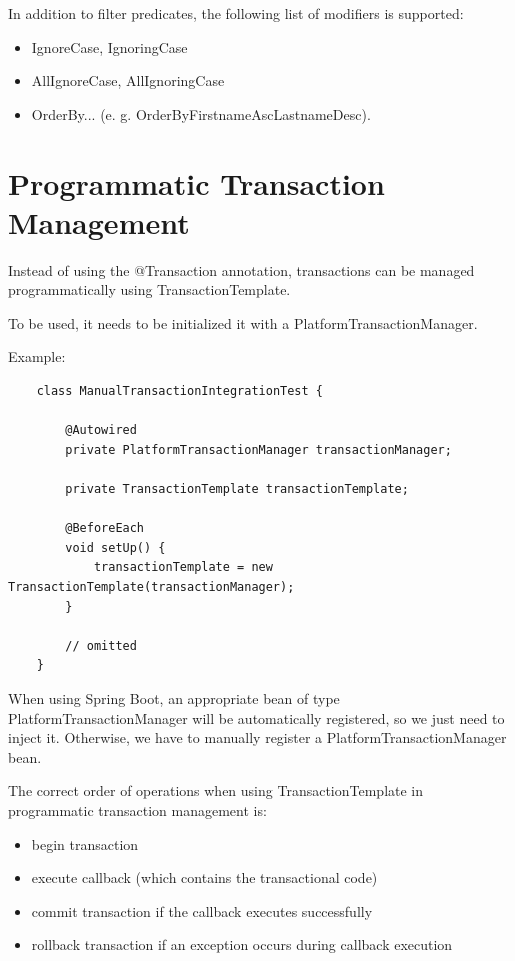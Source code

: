 \documentclass{scrartcl}
\begin{document}
    In addition to filter predicates, the following list of modifiers is supported:
    \begin{itemize}
        \item IgnoreCase, IgnoringCase
        \item AllIgnoreCase, AllIgnoringCase
        \item OrderBy... (e. g. OrderByFirstnameAscLastnameDesc).
    \end{itemize}

\section{Programmatic Transaction Management}

Instead of using the @Transaction annotation, transactions can be managed programmatically using TransactionTemplate.

To be used, it needs to be initialized it with a PlatformTransactionManager.

Example:

\begin{lstlisting}
    class ManualTransactionIntegrationTest {

        @Autowired
        private PlatformTransactionManager transactionManager;

        private TransactionTemplate transactionTemplate;

        @BeforeEach
        void setUp() {
            transactionTemplate = new TransactionTemplate(transactionManager);
        }

        // omitted
    }
\end{lstlisting}

When using Spring Boot, an appropriate bean of type PlatformTransactionManager will be automatically registered, so we just need to inject it. Otherwise, we have to manually register a PlatformTransactionManager bean.

The correct order of operations when using TransactionTemplate in programmatic transaction management is:

\begin{itemize}
    \item begin transaction
    \item execute callback (which contains the transactional code)
    \item commit transaction if the callback executes successfully
    \item rollback transaction if an exception occurs during callback execution
\end{itemize}
\end{document}
